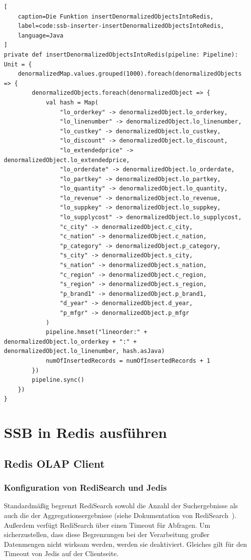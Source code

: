\begin{lstlisting}[
    caption=Die Funktion insertDenormalizedObjectsIntoRedis,
    label=code:ssb-inserter-insertDenormalizedObjectsIntoRedis,
    language=Java
]
private def insertDenormalizedObjectsIntoRedis(pipeline: Pipeline): Unit = {
	denormalizedMap.values.grouped(1000).foreach(denormalizedObjects => {
		denormalizedObjects.foreach(denormalizedObject => {
			val hash = Map(
				"lo_orderkey" -> denormalizedObject.lo_orderkey,
				"lo_linenumber" -> denormalizedObject.lo_linenumber,
				"lo_custkey" -> denormalizedObject.lo_custkey,
				"lo_discount" -> denormalizedObject.lo_discount,
				"lo_extendedprice" -> denormalizedObject.lo_extendedprice,
				"lo_orderdate" -> denormalizedObject.lo_orderdate,
				"lo_partkey" -> denormalizedObject.lo_partkey,
				"lo_quantity" -> denormalizedObject.lo_quantity,
				"lo_revenue" -> denormalizedObject.lo_revenue,
				"lo_suppkey" -> denormalizedObject.lo_suppkey,
				"lo_supplycost" -> denormalizedObject.lo_supplycost,
				"c_city" -> denormalizedObject.c_city,
				"c_nation" -> denormalizedObject.c_nation,
				"p_category" -> denormalizedObject.p_category,
				"s_city" -> denormalizedObject.s_city,
				"s_nation" -> denormalizedObject.s_nation,
				"c_region" -> denormalizedObject.c_region,
				"s_region" -> denormalizedObject.s_region,
				"p_brand1" -> denormalizedObject.p_brand1,
				"d_year" -> denormalizedObject.d_year,
				"p_mfgr" -> denormalizedObject.p_mfgr
			)
			pipeline.hmset("lineorder:" + denormalizedObject.lo_orderkey + ":" + denormalizedObject.lo_linenumber, hash.asJava)
			numOfInsertedRecords = numOfInsertedRecords + 1
		})
		pipeline.sync()
	})
}
\end{lstlisting}




\section{SSB in Redis ausführen}\label{sec:ssb-use-in-redis}

\subsection{Redis OLAP Client}

\subsubsection{Konfiguration von RediSearch und Jedis}
Standardmäßig begrenzt RediSearch sowohl die Anzahl der Suchergebnisse als auch die der Aggregationsergebnisse (siehe Dokumentation von RediSearch~\cite{redis_ltd_configuration_nodate}). Außerdem verfügt RediSearch über einen Timeout für Abfragen. Um sicherzustellen, dass diese Begrenzungen bei der Verarbeitung großer Datenmengen nicht wirksam werden, werden sie deaktiviert.
Gleiches gilt für den Timeout von Jedis auf der Clientseite.

